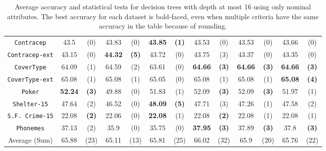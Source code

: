 \begin{table}
\begin{tabular}{c|cc|cc|cc|cc|cc|cc}
{\tt Contracep}     &  43.5        & (0)          &  43.83       & (0)          &  {\bf 43.85} & {\bf (1)}        & 43.53      & (0)          & 43.53      & (0)        & 43.66      & (0)        \\
{\tt Contracep-ext} &  43.15       & (0)          &  {\bf 44.32} & {\bf (5)}    &  43.72       & (0)              & 43.75      & (3)          & 43.37      & (0)        & 43.35      & (0)        \\
{\tt CoverType}     &  64.09       & (1)          &  64.59       & (2)          &  63.61       & (0)              &{\bf 64.66} & {\bf (3)}    & {\bf 64.66}& {\bf (3)}  & {\bf 64.66}& {\bf (3)}  \\
{\tt CoverType-ext} &  65.08       & (1)          &  65.08       & (1)          &  65.05       & (0)              & 65.08      & (1)          & 65.08      & (1)        & {\bf 65.08}& {\bf (4)}  \\
{\tt Poker}         &  {\bf 52.24} & {\bf (3)}    &  49.88       & (0)          &  51.83       & (1)              & 52.09      & {\bf (3)}    & 52.09      & {\bf (3)}  & 51.97      & (1)        \\
{\tt Shelter-15}    &  47.64       & (2)          &  46.52       & (0)          & {\bf 48.09}  & {\bf (5)}        & 47.71      & (3)          & 47.26      & (1)        & 47.58      & (2)        \\
{\tt S.F. Crime-15} &  22.08       & {\bf (2)}    &  22.06       & (0)          & {\bf 22.08}  & (1)              & 22.08      & {\bf (2)}    & 22.08      & (1)        & 22.08      & (1)        \\
{\tt Phonemes}      &  37.13       & (2)          &  35.9        & (0)          & 35.75        & (0)              &{\bf 37.95} & {\bf (3)}    & 37.89      & {\bf (3)}  & 37.8       & {\bf (3)}  \\
\hline
Average (Sum)       &  65.88       & (23)         &  65.11       & (13)         & 65.81        & (25)             &  66.02     & (32)         & 65.9       & (20)       & 65.76      & (22)
\end{tabular}
\normalsize
\caption{Average accuracy and statistical tests  for  decision trees with depth at most 16 using only nominal attributes. The best accuracy for each dataset is bold-faced, even when multiple criteria have the same accuracy in the table because of rounding.}
\label{tab:nominal-16}
\end{table}

